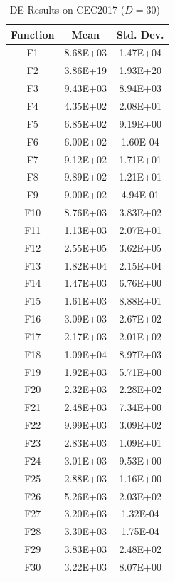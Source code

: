 \documentclass[11pt]{article}
\begin{document}
\begin{table}[htbp]
\centering
\caption{DE Results on CEC2017 ($D=30$)~\cite{mousavirad2021clude}}
\label{tab:de_cec2017_d30}
\small
\begin{tabular}{@{}ccc@{}}
\toprule
\textbf{Function} & \textbf{Mean} & \textbf{Std. Dev.} \\
\midrule
F1  & 8.68E+03 & 1.47E+04 \\
F2  & 3.86E+19 & 1.93E+20 \\
F3  & 9.43E+03 & 8.94E+03 \\
F4  & 4.35E+02 & 2.08E+01 \\
F5  & 6.85E+02 & 9.19E+00 \\
F6  & 6.00E+02 & 1.60E-04 \\
F7  & 9.12E+02 & 1.71E+01 \\
F8  & 9.89E+02 & 1.21E+01 \\
F9  & 9.00E+02 & 4.94E-01 \\
F10 & 8.76E+03 & 3.83E+02 \\
F11 & 1.13E+03 & 2.07E+01 \\
F12 & 2.55E+05 & 3.62E+05 \\
F13 & 1.82E+04 & 2.15E+04 \\
F14 & 1.47E+03 & 6.76E+00 \\
F15 & 1.61E+03 & 8.88E+01 \\
F16 & 3.09E+03 & 2.67E+02 \\
F17 & 2.17E+03 & 2.01E+02 \\
F18 & 1.09E+04 & 8.97E+03 \\
F19 & 1.92E+03 & 5.71E+00 \\
F20 & 2.32E+03 & 2.28E+02 \\
F21 & 2.48E+03 & 7.34E+00 \\
F22 & 9.99E+03 & 3.09E+02 \\
F23 & 2.83E+03 & 1.09E+01 \\
F24 & 3.01E+03 & 9.53E+00 \\
F25 & 2.88E+03 & 1.16E+00 \\
F26 & 5.26E+03 & 2.03E+02 \\
F27 & 3.20E+03 & 1.32E-04 \\
F28 & 3.30E+03 & 1.75E-04 \\
F29 & 3.83E+03 & 2.48E+02 \\
F30 & 3.22E+03 & 8.07E+00 \\
\bottomrule
\end{tabular}
\end{table}
\end{document}

